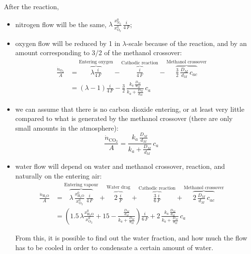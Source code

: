 \documentclass[a4paper,10pt]{article}
\newcommand{\HHO}{\ensuremath{\mathrm{H_2O}}}
\newcommand{\OO}{\ensuremath{\mathrm{O_2}}}
\newcommand{\NN}{\ensuremath{\mathrm{N_2}}}
\newcommand{\COO}{\ensuremath{\mathrm{CO_2}}}
\begin{document}
After the reaction,
\begin{itemize}
\item nitrogen flow will be the same, $\lambda \, \frac{x_\NN^0}{x_\OO^0}\,
\frac{i}{4\,F}$;
\item oxygen flow will be reduced by 1 in $\lambda$-scale because of the
reaction, and by an amount corresponding to 3/2 of the methanol
crossover:
\begin{equation}
\begin{aligned}
\frac{\dot n_\OO}{A} &= \overbrace{\lambda\frac{i}{4\,F}}^\text{Entering oxygen}
- \overbrace{\frac{i}{4\,F}}^\text{Cathodic reaction}
- \overbrace{ \frac{3}{2}\,\frac{D_M}{d_M}\,c_{ac}}^\text{Methanol crossover}\\
&= (\lambda - 1) \frac{i}{4\,F} - \frac{3}{2}\,\frac{k_a\,\frac{D_M}{d_M}}
{k_a+\frac{D_M}{d_M}}\,c_a
\end{aligned}
\end{equation}
\item we can assume that there is no carbon dioxide entering, or at least very
little compared to what is generated by the methanol crossover (there are only
small amounts in the atmosphere):
\begin{equation}
\frac{\dot n_\COO}{A} = \frac{k_a\,\frac{D_M}{d_M}} {k_a+\frac{D_M}{d_M}}\,c_a
\end{equation}
\item water flow will depend on water and methanol crossover, reaction, and
naturally on the entering air:
\begin{equation}
\begin{aligned}
\frac{\dot n_\HHO}{A} & = \overbrace{\lambda \, \frac{x_\HHO^0}{x_\OO^0} \,
\frac{i}{4\,F}}^\text{Entering vapour} +
\overbrace{2\,\frac{i}{F}}^\text{Water drag} +
\overbrace{\frac{3}{6}\frac{i}{F}}^\text{Cathodic reaction}
+ \overbrace{2\,\frac{D_M}{d_M}\,c_{ac}}^\text{Methanol crossover}\\
& = \left( 1.5\,\lambda \frac{x_\HHO^0}{x_\OO^0} + 15
- \frac{\frac{D_M}{d_M}}{k_a+\frac{D_M}{d_M}} \right)\frac{i}{6\,F}
+ 2\,\frac{k_a\,\frac{D_M}{d_M}}{k_a+\frac{D_M}{d_M}}\, c_a
\end{aligned}
\end{equation}

From this, it is possible to find out the water fraction, and how much the
flow has to be cooled in order to condensate a certain amount of water.

\end{itemize}
\end{document}
